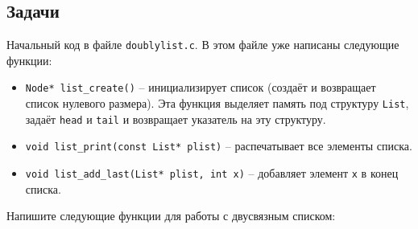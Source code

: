 \documentclass{article}
\begin{document}
\newpage
\subsection*{Задачи}
Начальный код в файле \texttt{doublylist.c}. В этом файле уже написаны следующие функции:
\begin{itemize}
\item \texttt{Node* list\_create()} -- инициализирует список (создаёт и возвращает список нулевого размера). Эта функция выделяет память под структуру \texttt{List}, задаёт \texttt{head} и \texttt{tail} и возвращает указатель на эту структуру.
\item \texttt{void list\_print(const List* plist)} -- распечатывает все элементы списка.
\item \texttt{void list\_add\_last(List* plist, int x)} -- добавляет элемент \texttt{x} в конец списка.
\end{itemize}
Напишите следующие функции для работы с двусвязным списком:
\end{document}
